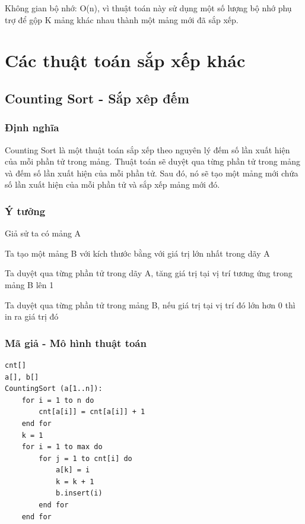 \documentclass[12pt,a4paper]{report}
\begin{document}
{Không gian bộ nhớ: O(n), vì thuật toán này sử dụng một số lượng bộ nhớ phụ trợ để gộp K mảng khác nhau thành một mảng mới đã sắp xếp.}

\chapter { Các thuật toán sắp xếp khác}

\section{ Counting Sort - Sắp xêp đếm}
 
\subsection{ Định nghĩa}

{\large \hspace{1cm} Counting Sort là một thuật toán sắp xếp theo nguyên lý đếm số lần xuất hiện của mỗi phần tử trong mảng. Thuật toán sẽ duyệt qua từng phần tử trong mảng và đếm số lần xuất hiện của mỗi phần tử. Sau đó, nó sẽ tạo một mảng mới chứa số lần xuất hiện của mỗi phần tử và sắp xếp mảng mới đó.}

\subsection{ Ý tưởng}

Giả sử ta có mảng A 

Ta tạo một mảng B với kích thước bằng với giá trị lớn nhất trong dãy A

Ta duyệt qua từng phần tử trong dãy A, tăng giá trị tại vị trí tương ứng trong mảng B lên 1

Ta duyệt qua từng phần tử trong mảng B, nếu giá trị tại vị trí đó lớn hơn 0 thì in ra giá trị đó

\subsection{ Mã giả - Mô hình thuật toán}

\begin{lstlisting}
cnt[]
a[], b[]
CountingSort (a[1..n]):
    for i = 1 to n do
        cnt[a[i]] = cnt[a[i]] + 1
    end for
    k = 1
    for i = 1 to max do
        for j = 1 to cnt[i] do
            a[k] = i
            k = k + 1
            b.insert(i)
        end for
    end for
\end{lstlisting}
\end{document}
